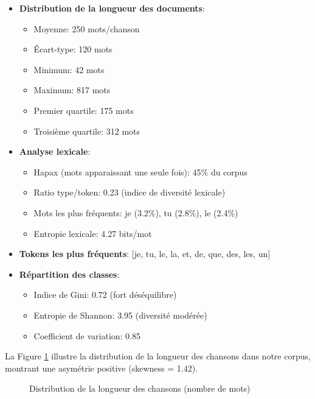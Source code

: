 \documentclass[a4paper,11pt]{article}
\begin{document}
\begin{itemize}
    \item \textbf{Distribution de la longueur des documents}:
    \begin{itemize}
        \item Moyenne: 250 mots/chanson
        \item Écart-type: 120 mots
        \item Minimum: 42 mots
        \item Maximum: 817 mots
        \item Premier quartile: 175 mots
        \item Troisième quartile: 312 mots
    \end{itemize}
    
    \item \textbf{Analyse lexicale}:
    \begin{itemize}
        \item Hapax (mots apparaissant une seule fois): 45\% du corpus
        \item Ratio type/token: 0.23 (indice de diversité lexicale)
        \item Mots les plus fréquents: je (3.2\%), tu (2.8\%), le (2.4\%)
        \item Entropie lexicale: 4.27 bits/mot
    \end{itemize}
    
    \item \textbf{Tokens les plus fréquents}: [je, tu, le, la, et, de, que, des, les, un]
    
    \item \textbf{Répartition des classes}:
    \begin{itemize}
        \item Indice de Gini: 0.72 (fort déséquilibre)
        \item Entropie de Shannon: 3.95 (diversité modérée)
        \item Coefficient de variation: 0.85
    \end{itemize}
\end{itemize}

La Figure \ref{fig:length-distribution} illustre la distribution de la longueur des chansons dans notre corpus, montrant une asymétrie positive (skewness = 1.42).

\begin{figure}[ht]
    \centering
    \caption{Distribution de la longueur des chansons (nombre de mots)}
    \label{fig:length-distribution}
\end{figure}
\end{document}
